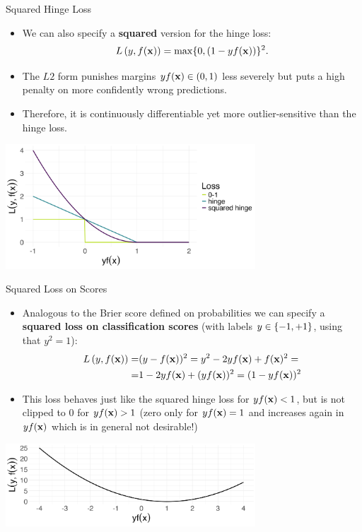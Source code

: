 \documentclass[11pt,compress,t,notes=noshow, xcolor=table]{beamer}
\begin{document}
\begin{vbframe}{Squared Hinge Loss}

\begin{itemize}
  \item We can also specify a \textbf{squared} version for the hinge loss:
  $$L\left(y, f(\mathbf{x})\right) = \max \{ 0, (1 - yf(\mathbf{x}))\}^2.$$
  \item The $L2$ form punishes margins $yf(\mathbf{x}) \in (0, 1)$ less severely but puts 
  a high penalty on more confidently wrong predictions. 
  \item Therefore, it is continuously differentiable yet more outlier-sensitive than the hinge loss.
\end{itemize}

\begin{center}
\includegraphics[width = 0.7\textwidth]{figure/hinge_squared.png}
\end{center}

\end{vbframe}


\begin{vbframe}{Squared Loss on Scores}


\begin{itemize}
  \item Analogous to the Brier score defined on probabilities we can specify a 
  \textbf{squared loss on classification scores} (with labels $y \in \{-1, +1\}$, using 
  that $y^2 = 1$):
  \begin{eqnarray*}
  L\left(y, f(\mathbf{x})\right) = &(y - f(\mathbf{x}))^2 = y^2 - 2yf(\mathbf{x}) + f(\mathbf{x})^2 =\\
  = &1 - 2yf(\mathbf{x}) + (yf(\mathbf{x}))^2 = (1 - yf(\mathbf{x}))^2
  \end{eqnarray*}
  \item This loss behaves just like the squared hinge loss for $yf(\mathbf{x}) < 1$, but is not clipped to $0$ for $yf(\mathbf{x})>1$ (zero only for $yf(\mathbf{x}) = 1$ and increases again in $yf(\mathbf{x})$ which is in general not desirable!)
\end{itemize}

\begin{center}
\includegraphics[width = 0.7\textwidth]{figure/squared_scores.png}
\end{center}

\end{vbframe}
\end{document}

